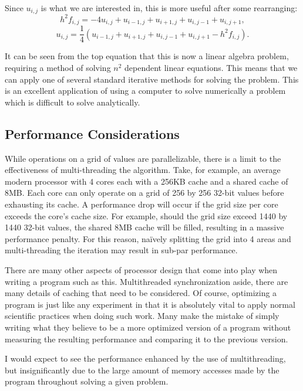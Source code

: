 Since $u_{i,j}$ is what we are interested in, this is more useful after some rearranging:
$$h^2f_{i,j} = -4u_{i,j} + u_{i-1,j} + u_{i+1,j} + u_{i,j-1} + u_{i,j+1},$$
\begin{equation} \label{eq:poisson}
u_{i,j} = \frac{1}{4}(u_{i-1,j} + u_{i+1,j} + u_{i,j-1} + u_{i,j+1} - h^2f_{i,j}).
\end{equation}

It can be seen from the top equation that this is now a linear algebra problem, requiring a method of solving
$n^2$ dependent linear equations. This means that we can apply one of several standard iterative methods
for solving the problem. This is an excellent application of using a computer to solve numerically a problem
	which is difficult to solve analytically.

\subsection{Performance Considerations}
While operations on a grid of values are parallelizable, there is a limit to
the effectiveness of multi-threading the algorithm. Take, for example, an average
modern processor with 4 cores each with a 256KB cache and a shared cache of 8MB\@. Each core
can only operate on a grid of 256 by 256 32-bit values before exhausting its cache.
A performance drop will occur if the grid size per core exceeds the core's cache
size. For example, should the grid size exceed 1440 by 1440 32-bit values,
the shared 8MB cache will
be filled, resulting in a massive performance penalty. For this reason, na\"{i}vely splitting
the grid into 4 areas and multi-threading the iteration may result in sub-par performance.

There are many other aspects of processor design that come into play when writing a program
such as this. Multithreaded synchronization aside, there are many details of caching that
need to be considered. Of course, optimizing a program is just like any experiment in that
it is absolutely vital to apply normal scientific practices when doing such work. Many make
the mistake of simply writing what they believe to be a more optimized version of a program
without measuring the resulting performance and comparing it to the previous version.

I would expect to see the performance enhanced by the use of multithreading, but insignificantly
due to the large amount of memory accesses made by the program throughout solving a given problem.

